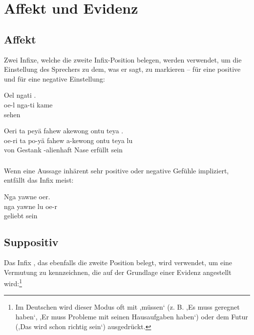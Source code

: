 \section{Affekt und Evidenz}

\subsection{Affekt} Zwei Infixe, welche die zweite Infix-Position belegen, werden verwendet, um die Einstellung des Sprechers zu dem, was er sagt, zu markieren --  für eine positive und  für eine negative Einstellung:

\begin{interlin}
	\glll \Nfilm{}Oel ngati . \\
	oe-l nga-ti kame \\
	  sehen \\
\end{interlin}

\begin{interlin}
	\glll \Nfilm{}Oeri ta peyä fahew akewong ontu teya . \\
	oe-ri ta po-yä fahew a-kewong ontu teya lu\\
	 von  Gestank -alienhaft Nase erfüllt sein \\
\end{interlin}

\subsubsection{} Wenn eine Aussage inhärent sehr positive oder negative Gefühle impliziert, entfällt das Infix meist:

\begin{interlin}
	\glll \Npawl{}Nga yawne  oer. \\
	nga yawne lu oe-r \\
	 geliebt sein  \\
\end{interlin}

\subsection{Suppositiv} Das Infix , das ebenfalls die zweite Position belegt, wird verwendet, um eine Vermutung zu kennzeichnen, die auf der Grundlage einer Evidenz angestellt wird:\footnote{Im Deutschen wird dieser Modus oft mit ,müssen‘ (z. B. ,Es muss geregnet haben‘, ,Er muss Probleme mit seinen Hausaufgaben haben‘) oder dem Futur (,Das wird schon richtig sein‘) ausgedrückt.}


